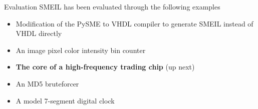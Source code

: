 \documentclass{beamer}
\begin{document}
\begin{frame}{Evaluation}
  SMEIL has been evaluated through the following examples
  \begin{itemize}
    \item Modification of the PySME to VHDL compiler to generate SMEIL instead of
      VHDL directly
    \item An image pixel color intensity bin counter
    \item \textbf{The core of a high-frequency trading chip} (up next)
    \item An MD5 bruteforcer
    \item A model 7-segment digital clock
  \end{itemize}
  
\end{frame}

\end{document}

